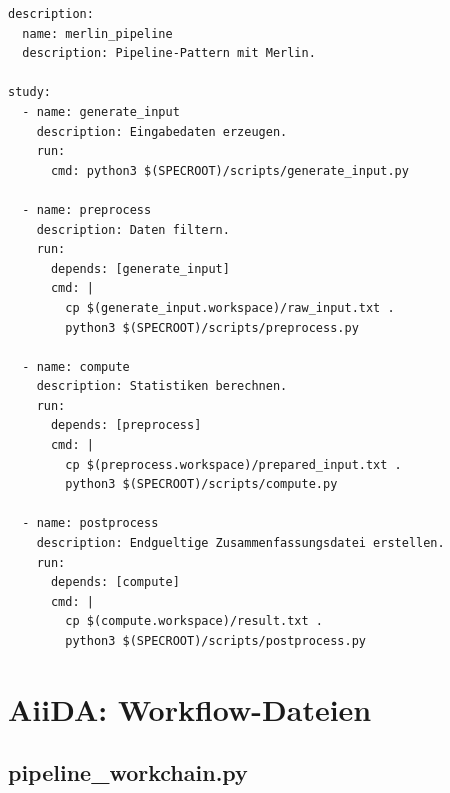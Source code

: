 \begin{lstlisting}[caption={pipeline.yaml: Vollständige Workflow-Datei (Merlin)},
                   label={lst:app:merlin:yaml}]
description:
  name: merlin_pipeline
  description: Pipeline-Pattern mit Merlin.

study:
  - name: generate_input
    description: Eingabedaten erzeugen.
    run:
      cmd: python3 $(SPECROOT)/scripts/generate_input.py

  - name: preprocess
    description: Daten filtern.
    run:
      depends: [generate_input]
      cmd: |
        cp $(generate_input.workspace)/raw_input.txt .
        python3 $(SPECROOT)/scripts/preprocess.py

  - name: compute
    description: Statistiken berechnen.
    run:
      depends: [preprocess]
      cmd: |
        cp $(preprocess.workspace)/prepared_input.txt .
        python3 $(SPECROOT)/scripts/compute.py

  - name: postprocess
    description: Endgueltige Zusammenfassungsdatei erstellen.
    run:
      depends: [compute]
      cmd: |
        cp $(compute.workspace)/result.txt .
        python3 $(SPECROOT)/scripts/postprocess.py
\end{lstlisting}

\chapter{AiiDA: Workflow-Dateien}
\label{app:aiida}

\section{pipeline\_workchain.py}
\label{app:aiida:workchain}

